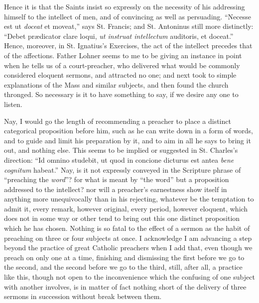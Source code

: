 Hence it is that the Saints insist so expressly on the necessity of
his addressing himself to the intellect of men, and of convincing as
well as persuading. ``Necesse est ut \emph{doceat} et moveat,''
says St. Francis; and St. Antoninus still more distinctly: ``Debet
prædicator clare loqui, \emph{ut instruat intellectum} auditoris, et
doceat.'' Hence, moreover, in St. Ignatius's Exercises, the act of
the intellect precedes that of the affections. Father Lohner seems to
me to be giving an instance in point when he tells us of a
court-preacher, who delivered what would be commonly considered
eloquent sermons, and attracted no one; and next took to simple
explanations of the Mass and similar subjects, and then found the
church thronged. So necessary is it to have something to say, if we
desire any one to listen.

Nay, I would go the length of recommending a preacher to place a
distinct categorical proposition before him, such as he can write down
in a form of words, and to guide and limit his preparation by it, and
to aim in all he says to bring it out, and nothing else. This
seems to be implied or suggested in St. Charles's direction: ``Id
omnino studebit, ut quod in concione dicturus est antea \emph{bene
cognitum} habeat.'' Nay, is it not expressly conveyed in the
Scripture phrase of ``preaching the \emph{word}''? for what is meant
by ``the word'' but a proposition addressed to the intellect?
nor will a preacher's earnestness show itself in anything more
unequivocally than in his rejecting, whatever be the temptation to
admit it, every remark, however original, every period, however
eloquent, which does not in some way or other tend to bring out this
one distinct proposition which he has chosen. Nothing is so fatal to
the effect of a sermon as the habit of preaching on three or four
subjects at once. I acknowledge I am advancing a step beyond the
practice of great Catholic preachers when I add that, even though we
preach on only one at a time, finishing and dismissing the first
before we go to the second, and the second before we go to the third,
still, after all, a practice like this, though not open to the
inconvenience which the confusing of one subject with another
involves, is in matter of fact nothing short of the delivery of three
sermons in succession without break between them.

